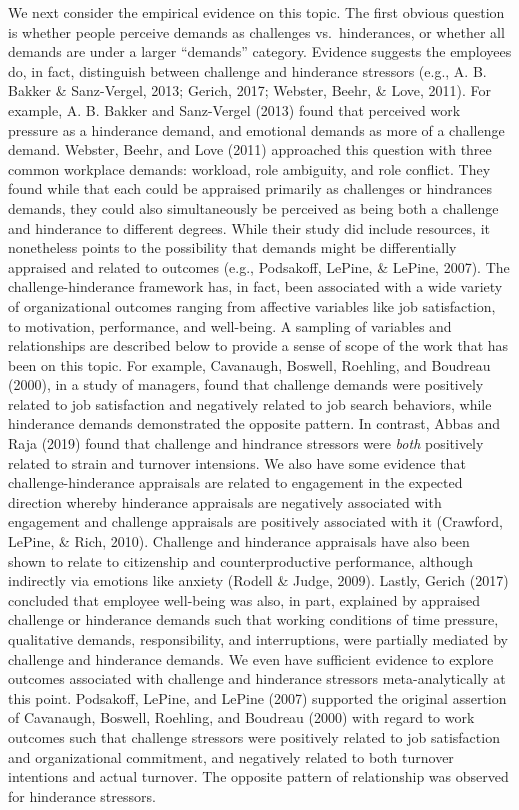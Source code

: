 \documentclass[
  english,
  man]{apa6}
\begin{document}
We next consider the empirical evidence on this topic. The first obvious question is whether people perceive demands as challenges vs.~hinderances, or whether all demands are under a larger ``demands'' category. Evidence suggests the employees do, in fact, distinguish between challenge and hinderance stressors (e.g., A. B. Bakker \& Sanz-Vergel, 2013; Gerich, 2017; Webster, Beehr, \& Love, 2011). For example, A. B. Bakker and Sanz-Vergel (2013) found that perceived work pressure as a hinderance demand, and emotional demands as more of a challenge demand. Webster, Beehr, and Love (2011) approached this question with three common workplace demands: workload, role ambiguity, and role conflict. They found while that each could be appraised primarily as challenges or hindrances demands, they could also simultaneously be perceived as being both a challenge and hinderance to different degrees.
While their study did include resources, it nonetheless points to the possibility that demands might be differentially appraised and related to outcomes (e.g., Podsakoff, LePine, \& LePine, 2007). The challenge-hinderance framework has, in fact, been associated with a wide variety of organizational outcomes ranging from affective variables like job satisfaction, to motivation, performance, and well-being. A sampling of variables and relationships are described below to provide a sense of scope of the work that has been on this topic. For example, Cavanaugh, Boswell, Roehling, and Boudreau (2000), in a study of managers, found that challenge demands were positively related to job satisfaction and negatively related to job search behaviors, while hinderance demands demonstrated the opposite pattern. In contrast, Abbas and Raja (2019) found that challenge and hindrance stressors were \emph{both} positively related to strain and turnover intensions. We also have some evidence that challenge-hinderance appraisals are related to engagement in the expected direction whereby hinderance appraisals are negatively associated with engagement and challenge appraisals are positively associated with it (Crawford, LePine, \& Rich, 2010). Challenge and hinderance appraisals have also been shown to relate to citizenship and counterproductive performance, although indirectly via emotions like anxiety (Rodell \& Judge, 2009). Lastly, Gerich (2017) concluded that employee well-being was also, in part, explained by appraised challenge or hinderance demands such that working conditions of time pressure, qualitative demands, responsibility, and interruptions, were partially mediated by challenge and hinderance demands.
We even have sufficient evidence to explore outcomes associated with challenge and hinderance stressors meta-analytically at this point. Podsakoff, LePine, and LePine (2007) supported the original assertion of Cavanaugh, Boswell, Roehling, and Boudreau (2000) with regard to work outcomes such that challenge stressors were positively related to job satisfaction and organizational commitment, and negatively related to both turnover intentions and actual turnover. The opposite pattern of relationship was observed for hinderance stressors.
\end{document}
